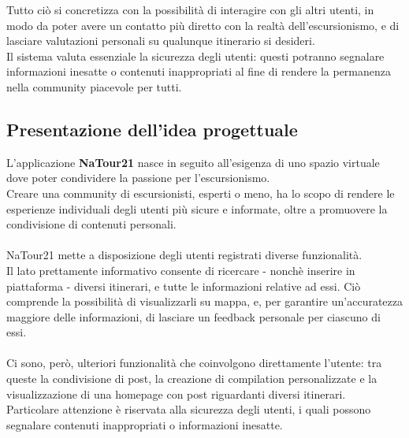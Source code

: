 \documentclass{natourDoc}
\begin{document}
Tutto ciò si concretizza con la possibilità di interagire con gli altri utenti, in modo da poter avere un contatto più diretto con
la realtà dell'escursionismo, e di lasciare valutazioni personali su qualunque itinerario si desideri.\\

Il sistema valuta essenziale la sicurezza degli utenti: questi potranno segnalare informazioni inesatte o contenuti inappropriati al fine
di rendere la permanenza nella community piacevole per tutti.

\subsection{Presentazione dell'idea progettuale}

L'applicazione \textbf{NaTour21} nasce in seguito all'esigenza di uno spazio virtuale dove poter condividere la passione per l'escursionismo.\\
Creare una community di escursionisti, esperti o meno, ha lo scopo di rendere le esperienze individuali degli utenti più sicure e informate,
oltre a promuovere la condivisione di contenuti personali.\\\\
NaTour21 mette a disposizione degli utenti registrati diverse funzionalità.\\
Il lato prettamente informativo consente di ricercare - nonchè inserire in piattaforma - diversi itinerari, e tutte le informazioni relative ad essi.
Ciò comprende la possibilità di visualizzarli su mappa, e, per garantire un'accuratezza maggiore delle informazioni, di lasciare
un feedback personale per ciascuno di essi.\\\\
Ci sono, però, ulteriori funzionalità che coinvolgono direttamente l'utente: tra queste la condivisione di post, la creazione di compilation personalizzate e
la visualizzazione di una homepage con post riguardanti diversi itinerari.\\
Particolare attenzione è riservata alla sicurezza degli utenti, i quali possono segnalare contenuti inappropriati o informazioni inesatte.
\end{document}
